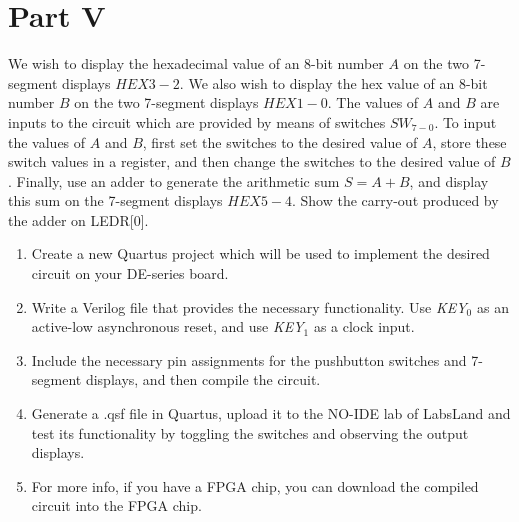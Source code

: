 \documentclass[epsfig,10pt,fullpage]{article}
\newcommand{\CommonDocsPath}{../../../common/docs}
\begin{document}
\section*{Part V}
We wish to display the hexadecimal value of an 8-bit number $A$
on the two 7-segment displays $HEX3-2$.  We also wish to display the
hex value of an 8-bit number $B$ on the two 7-segment displays $HEX1-0$. 
The values of $A$ and $B$ are inputs to the circuit which are
provided by means of switches $SW_{7-0}$.  To input the values of $A$ and $B$, 
first set the switches to the desired value of $A$, store these switch values in a register, 
and then change the switches to the desired value of $B$.  Finally, use an adder to 
generate the arithmetic sum $S = A + B$, and display this sum on the 7-segment 
displays $HEX5-4$. Show the carry-out produced by the adder on LEDR[0].
\begin{enumerate}
\item Create a new Quartus project which will be used to implement the desired
circuit on your DE-series board.
\item Write a Verilog file that provides the necessary functionality. Use {\it KEY}$_0$ as
an active-low asynchronous reset, and use {\it KEY}$_1$ as a clock input.
\item Include the necessary pin assignments for the pushbutton switches and 7-segment
displays, and then compile the circuit.
\item Generate a .qsf file in Quartus, upload it to the NO-IDE lab of LabsLand and test its functionality 
by toggling the switches and observing the output displays.
\item For more info, if you have a FPGA chip, you can download the compiled circuit into the FPGA chip.
\end{enumerate}




\end{document}
